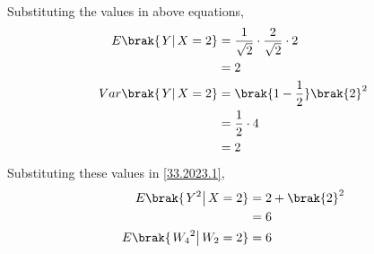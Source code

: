 \documentclass[journal,12pt,twocolumn]{IEEEtran}
\theoremstyle{remark}
\begin{document}
Substituting the values in above equations,
\begin{align}
E\brak{\left.Y\right | X=2} &= \frac{1}{\sqrt{2}}\cdot\frac{2}{\sqrt{2}}\cdot 2\\
			    &= 2\\
Var\brak{\left.Y\right | X=2} &= \brak{1 - \frac{1}{2}}\brak{2}^2\\
			      &= \frac{1}{2}\cdot 4\\
			      &= 2\\
\end{align}
Substituting these values in \eqref{33.2023.1},
\begin{align}
E\brak{\left.Y^2\right | X=2} &= 2 + \brak{2}^2\\
			      &= 6\\
E\brak{\left.{W_4}^2\right | W_2=2} &= 6
\end{align}
\end{document}

